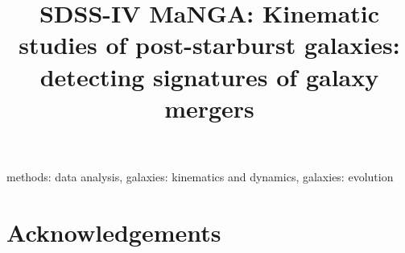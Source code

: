 \documentclass[11pt,fleqn,usenatbib]{mnras} %
\title[Kinematics of post-starburst galaxies]{SDSS-IV MaNGA: Kinematic studies of post-starburst galaxies: detecting signatures of galaxy mergers}
\begin{document}



\begingroup
\let\clearpage\relax
\tableofcontents
\listoftables
\listoffigures
\endgroup



\label{firstpage}
\pagerange{\pageref{firstpage}--\pageref{lastpage}}
\maketitle

\newpage

\begin{abstract}

\end{abstract}

\begin{keywords}
methods: data analysis, galaxies: kinematics and dynamics, galaxies: evolution
\end{keywords}












\section*{Acknowledgements}




 


\appendix




\bsp	%
\label{lastpage}
\end{document}
